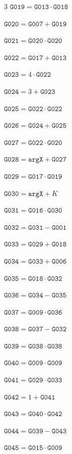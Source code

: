 \documentclass[10pt]{article}
\begin{document}
\begin{multicols}{3}
\noindent $\mathtt{G019}=\mathtt{G013}\cdot \mathtt{G018}$\par
\noindent $\mathtt{G020}=\mathtt{G007}+\mathtt{G019}$\par
\noindent $\mathtt{G021}=\mathtt{G020}\cdot \mathtt{G020}$\par
\noindent $\mathtt{G022}=\mathtt{G017}+\mathtt{G013}$\par
\noindent $\mathtt{G023}=4\cdot \mathtt{G022}$\par
\noindent $\mathtt{G024}=3+\mathtt{G023}$\par
\noindent $\mathtt{G025}=\mathtt{G022}\cdot \mathtt{G022}$\par
\noindent $\mathtt{G026}=\mathtt{G024}+\mathtt{G025}$\par
\noindent $\mathtt{G027}=\mathtt{G022}\cdot \mathtt{G020}$\par
\noindent $\mathtt{G028}=\mathtt{argX}+\mathtt{G027}$\par
\noindent $\mathtt{G029}=\mathtt{G017}\cdot \mathtt{G019}$\par
\noindent $\mathtt{G030}=\mathtt{argX}+K$\par
\noindent $\mathtt{G031}=\mathtt{G016}\cdot \mathtt{G030}$\par
\noindent $\mathtt{G032}=\mathtt{G031}-\mathtt{G001}$\par
\noindent $\mathtt{G033}=\mathtt{G029}+\mathtt{G018}$\par
\noindent $\mathtt{G034}=\mathtt{G033}+\mathtt{G006}$\par
\noindent $\mathtt{G035}=\mathtt{G018}\cdot \mathtt{G032}$\par
\noindent $\mathtt{G036}=\mathtt{G034}-\mathtt{G035}$\par
\noindent $\mathtt{G037}=\mathtt{G009}\cdot \mathtt{G036}$\par
\noindent $\mathtt{G038}=\mathtt{G037}-\mathtt{G032}$\par
\noindent $\mathtt{G039}=\mathtt{G038}\cdot \mathtt{G038}$\par
\noindent $\mathtt{G040}=\mathtt{G009}\cdot \mathtt{G009}$\par
\noindent $\mathtt{G041}=\mathtt{G029}\cdot \mathtt{G033}$\par
\noindent $\mathtt{G042}=1+\mathtt{G041}$\par
\noindent $\mathtt{G043}=\mathtt{G040}\cdot \mathtt{G042}$\par
\noindent $\mathtt{G044}=\mathtt{G039}-\mathtt{G043}$\par
\noindent $\mathtt{G045}=\mathtt{G015}\cdot \mathtt{G009}$\par

\end{multicols}
\end{document}
